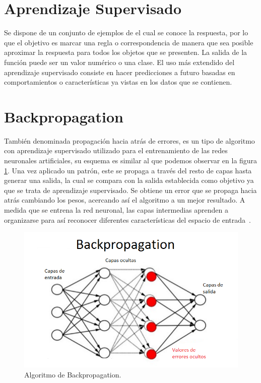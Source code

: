 \section{Aprendizaje Supervisado}
Se dispone de un conjunto de ejemplos de el cual se conoce la respuesta, por lo que el objetivo es marcar una regla o correspondencia de manera que sea posible aproximar la respuesta para todos los objetos que se presenten. La salida de la función puede ser un valor numérico o una clase.
El uso más extendido del aprendizaje supervisado consiste en hacer predicciones a futuro basadas en comportamientos o características ya vistas en los datos que se contienen\cite{alejandrocassis_aprendizaje_2015}.

\section{Backpropagation}
También denominada propagación hacia atrás de errores, es un tipo de algoritmo con aprendizaje supervisado utilizado para el entrenamiento de las redes neuronales artificiales, su esquema es similar al que podemos observar en la figura \ref{fig:Backpro}. Una vez aplicado un patrón, este se propaga a través del resto de capas hasta generar una salida, la cual se compara con la salida establecida como objetivo ya que se trata de aprendizaje supervisado. Se obtiene un error que se propaga hacia atrás cambiando los pesos, acercando así el algoritmo a un mejor resultado.
A medida que se entrena la red neuronal, las capas intermedias aprenden a organizarse para así reconocer diferentes características del espacio de entrada~\cite{backpropagation_2015}.

\begin{figure}
\centering
\includegraphics[width=.9\textwidth]{img/backpropagation}
\caption{Algoritmo de Backpropagation.}
\label{fig:Backpro}
\end{figure}



